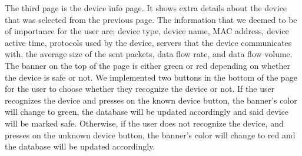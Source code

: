 \documentclass{article}
\begin{document}
The third page is the device info page. It shows extra details about the device that was selected from the previous page. The information that we deemed to be of importance for the user are; device type, device name, MAC address, device active time, protocols used by the device, servers that the device communicates with, the average size of the sent packets, data flow rate, and data flow volume. The banner on the top of the page is either green or red depending on whether the device is safe or not. We implemented two buttons in the bottom of the page for the user to choose whether they recognize the device or not. If the user recognizes the device and presses on the known device button, the banner’s color will change to green, the database will be updated accordingly and said device will be marked safe. Otherwise, if the user does not recognize the device, and presses on the unknown device button, the banner’s color will change to red and the database will be updated accordingly.\newline
\end{document}
